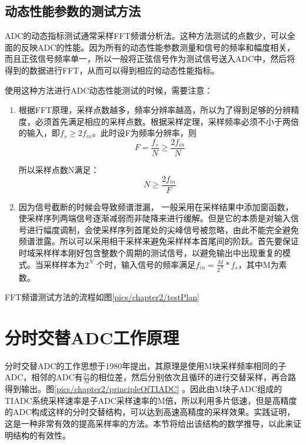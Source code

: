 	\subsection{动态性能参数的测试方法}
		ADC的动态指标测试通常采样FFT频谱分析法。这种方法测试的点数少，可以全面的反映ADC的性能。因为所有的动态性能参数测量和信号的频率和幅度相关，而且正弦信号频率单一，所以一般将正弦信号作为测试信号送入ADC中，然后将得到的数据进行FFT，从而可以得到相应的动态性能指标。\par
		使用这种方法进行ADC动态性能测试的时候，需要注意：
		\begin{enumerate}
			\item 
				根据FFT原理，采样点数越多，频率分辨率越高，所以为了得到足够的分辨精度，必须首先满足相应的采样点数。根据采样定理，采样频率必须不小于两倍的输入，即$f_s \ge 2f_{in}$。此时设F为频率分辨率，则
				\begin{equation}
					F = \frac{{{f_s}}}{N} \ge \frac{{2{f_{in}}}}{N}
				\end{equation}
				
				所以采样点数N满足：
				\begin{equation}
					N \ge \frac{{2{f_{in}}}}{F}
				\end{equation}
			\item
				因为信号截断的时候会导致频谱泄漏，		一般采用在采样结果中添加窗函数，使采样序列两端信号逐渐减弱而非陡降来进行缓解。但是它的本质是对输入信号进行幅度调制，会使采样序列首尾处的尖峰信号被忽略，由此不能完全避免频谱泄露。所以可以采用相干采样来避免采样样本首尾间的阶跃。首先要保证时域采样样本刚好包含整数个周期的测试信号，以避免输出中出现重复的模式。当采样样本为$2^N$ 个时，输入信号的频率满足${f_{in}} = \frac{M}{{{2^N}}}*{f_s}$，其中M为素数。
			
		\end{enumerate}
		
		FFT频谱测试方法的流程如图\ref{pics/chapter2/testPlan}
		
\section{分时交替ADC工作原理}\label{sec:principleOfTIADC}
	分时交替ADC的工作思想于1980年提出，其原理是使用M块采样频率相同的子ADC，相邻的ADC有$\frac{2\pi }{M}$的相位差，然后分别依次且循环的进行交替采样，再合路得到输出。图\ref{pics/chapter2/principleOfTIADC}	。因此由M块子ADC组成的TIADC系统采样速率是子ADC采样速率的M倍，所以利用多片低速，但是高精度的ADC构成这样的分时交替结构，可以达到高速高精度的采样效果。实践证明，这是一种非常有效的提高采样率的方法。本节将给出该结构的数学推导，以此来证明结构的有效性。
	
